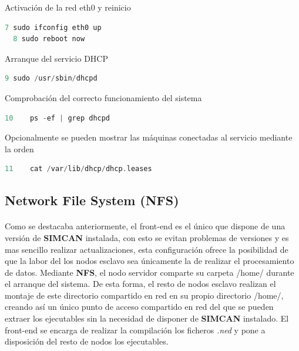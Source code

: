Activación de la red eth0 y reinicio

\begin{lstlisting}[language=c,frame=single,numbers=none]
  7	sudo ifconfig eth0 up
  8	sudo reboot now 
\end{lstlisting}

Arranque del servicio DHCP

\begin{lstlisting}[language=c,frame=single,numbers=none]
  9	sudo /usr/sbin/dhcpd
\end{lstlisting}

Comprobación del correcto funcionamiento del sistema

\begin{lstlisting}[language=c,frame=single,numbers=none]
  10	ps -ef | grep dhcpd
\end{lstlisting}

Opcionalmente se pueden mostrar las máquinas conectadas al servicio mediante la orden

\begin{lstlisting}[language=c,frame=single,numbers=none]
  11	cat /var/lib/dhcp/dhcp.leases 
\end{lstlisting}

\subsection{Network File System (NFS)}
\label{makereference3.5}
\paragraph{}

Como se destacaba anteriormente, el front-end es el único que dispone de una versión de \textbf{SIMCAN} instalada, con esto se evitan problemas de versiones y es mas sencillo realizar actualizaciones, esta configuración ofrece la posibilidad de que la labor del los nodos esclavo sea únicamente la de realizar el procesamiento de datos. Mediante \textbf{NFS}, el nodo servidor comparte su carpeta /home/ durante el arranque del sistema. De esta forma, el resto de nodos esclavo realizan el montaje de este directorio compartido en red en su propio directorio /home/, creando así un único punto de acceso compartido en red del que se pueden extraer los ejecutables sin la necesidad de disponer de \textbf{SIMCAN} instalado. El front-end se encarga de realizar la compilación los ficheros \textit{.ned} y pone a disposición del resto de nodos los ejecutables.


